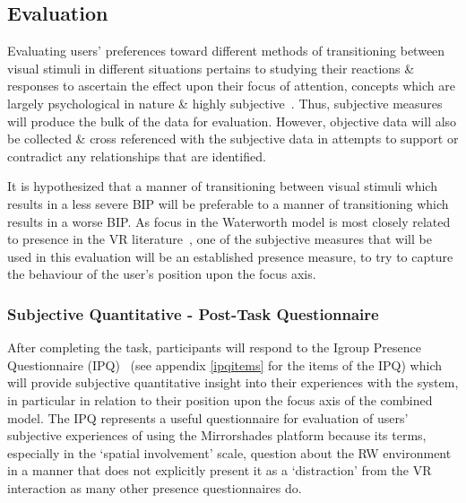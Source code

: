 

\subsection{Evaluation}


Evaluating users' preferences toward different methods of transitioning between visual stimuli in different situations pertains to studying their reactions \& responses to ascertain the effect upon their focus of attention, concepts which are largely psychological in nature \& highly subjective~\cite{Ijsselsteijn2001}. Thus, subjective measures will produce the bulk of the data for evaluation. However, objective data will also be collected \& cross referenced with the subjective data in attempts to support or contradict any relationships that are identified.

It is hypothesized that a manner of transitioning between visual stimuli which results in a less severe BIP will be preferable to a manner of transitioning which results in a worse BIP. As focus in the Waterworth model is most closely related to presence in the VR literature~\cite{Waterworth2001}, one of the subjective measures that will be used in this evaluation will be an established presence measure, to try to capture the behaviour of the user's position upon the focus axis.

\subsubsection{Subjective Quantitative - Post-Task Questionnaire}
After completing the task, participants will respond to the Igroup Presence Questionnaire (IPQ)~\cite{Schubert2001} (see appendix \ref{ipqitems} for the items of the IPQ) which will provide subjective quantitative insight into their experiences with the system, in particular in relation to their position upon the focus axis of the combined model. The IPQ represents a useful questionnaire for evaluation of users' subjective experiences of using the Mirrorshades platform because its terms, especially in the `spatial involvement' scale, question about the RW environment in a manner that does not explicitly present it as a `distraction' from the VR interaction as many other presence questionnaires do.

